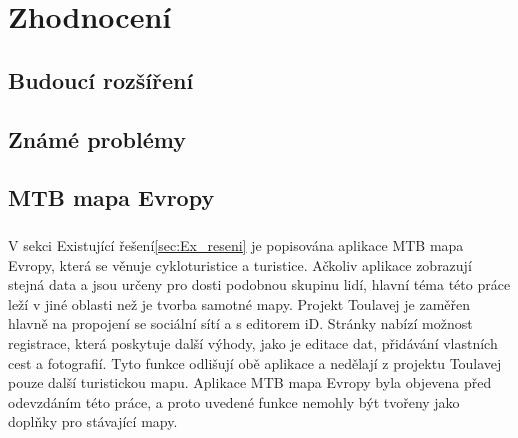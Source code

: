 \documentclass[11pt,a4paper,titlepage,oneside]{book}
\begin{document}
	\chapter{Zhodnocení}
		\section{Budoucí rozšíření}

		\section{Známé problémy}

		\section{MTB mapa Evropy}
			\paragraph{} V sekci Existující řešení\ref{sec:Ex_reseni} je popisována aplikace MTB mapa Evropy, která se věnuje cykloturistice a turistice. Ačkoliv aplikace zobrazují stejná data a jsou určeny pro dosti podobnou skupinu lidí, hlavní téma této práce leží v jiné oblasti než je tvorba samotné mapy. Projekt Toulavej je zaměřen hlavně na propojení se sociální sítí a s editorem iD. Stránky  nabízí možnost registrace, která poskytuje další výhody, jako je editace dat, přidávání vlastních cest a fotografií. Tyto funkce odlišují obě aplikace a nedělají z projektu Toulavej pouze další turistickou mapu. Aplikace MTB mapa Evropy byla objevena před odevzdáním této práce, a proto uvedené funkce nemohly být tvořeny jako doplňky pro stávající mapy.



\newpage 
\end{document}
